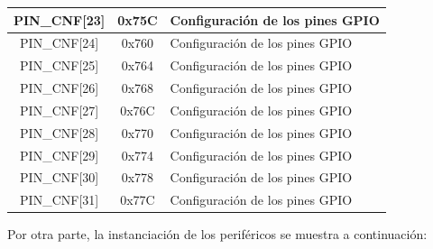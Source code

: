 \documentclass[12pt,a4paper]{article}
\begin{document}
\begin{table}[h!]
{\begin{tabularx}{\textwidth}{|c|c|X|}
PIN\_CNF[23] & 0x75C & Configuración de los pines GPIO \\ \hline
PIN\_CNF[24] & 0x760 & Configuración de los pines GPIO \\ \hline
PIN\_CNF[25] & 0x764 & Configuración de los pines GPIO \\ \hline
PIN\_CNF[26] & 0x768 & Configuración de los pines GPIO \\ \hline
PIN\_CNF[27] & 0x76C & Configuración de los pines GPIO \\ \hline
PIN\_CNF[28] & 0x770 & Configuración de los pines GPIO \\ \hline
PIN\_CNF[29] & 0x774 & Configuración de los pines GPIO \\ \hline
PIN\_CNF[30] & 0x778 & Configuración de los pines GPIO \\ \hline
PIN\_CNF[31] & 0x77C & Configuración de los pines GPIO \\ \hline
\end{tabularx}
}
\label{tab:registros}
\end{table}

Por otra parte, la instanciación de los periféricos se muestra a continuación:

\begin{table}[h!]
\centering
\caption{Instanciación de los periféricos}
\label{tab:perifericos}
\end{table}
\end{document}
